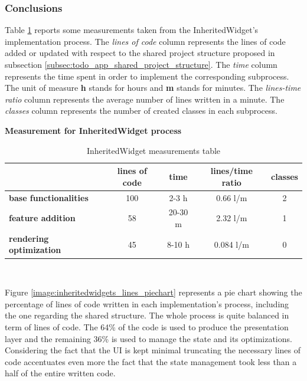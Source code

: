 \subsubsection{Conclusions} 
\label{subpar:render_optimizations_inherited_widget}
Table \ref{table:recap_inheritedwidgets} reports some measurements taken from the InheritedWidget's implementation process. The \textit{lines of code} column represents the lines of code added or updated with respect to the shared project structure proposed in subsection \ref{subsec:todo_app_shared_project_structure}. The \textit{time }column represents the time spent in order to implement the corresponding subprocess. The unit of measure \textbf{h} stands for hours and \textbf{m} stands for minutes. The \textit{lines-time ratio} column represents the average number of lines written in a minute. The \textit{classes} column represents the number of created classes in each subprocess.
\begin{table}[H]
    \caption*{\textbf{Measurement for InheritedWidget process}}
    \centering 
    
    \begin{tabular}{| l | c | c | c | c |}
    \hline
    \rowcolor{bluepoli!40} %
    \hline
     & \textbf{lines of code} & \textbf{time} & \textbf{lines/time ratio} & \textbf{classes} \T\B \\
     \hline
    \textbf{base functionalities} & 100 & 2-3 h & 0.66 l/m & 2  \T\B \\ 
    \textbf{feature addition} & 58 & 20-30 m & 2.32 l/m & 1 \T\B\\ 
    \textbf{rendering optimization} & 45 & 8-10 h & 0.084  l/m & 0 \B\\
    \hline
    \end{tabular}
    \\[10pt]
    \caption{InheritedWidget measurements table}
    \label{table:recap_inheritedwidgets}
\end{table}

Figure \ref{image:inheritedwidgets_lines_piechart} represents a pie chart showing the percentage of lines of code written in each implementation's process, including the one regarding the shared structure. The whole process is quite balanced in term of lines of code. The 64\% of the code is used to produce the presentation layer and the remaining 36\% is used to manage the state and its optimizations. Considering the fact that the UI is kept minimal truncating the necessary lines of code accentuates even more the fact that the state management took less than a half of the entire written code. 

